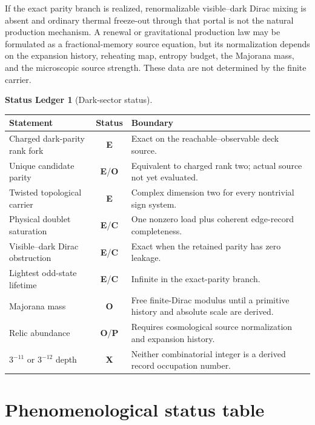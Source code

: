 \documentclass[11pt,oneside,openany]{book}
\numberwithin{equation}{chapter}
\theoremstyle{definition}
\newtheorem{ledger}[theorem]{Status Ledger}
\theoremstyle{remark}
\newcommand{\statusE}{\textcolor{ExactColor}{\textbf{E}}}
\newcommand{\statusC}{\textcolor{CondColor}{\textbf{C}}}
\newcommand{\statusP}{\textcolor{PostColor}{\textbf{P}}}
\newcommand{\statusO}{\textcolor{OpenColor}{\textbf{O}}}
\newcommand{\statusX}{\textcolor{SuperColor}{\textbf{X}}}
\begin{document}
If the exact parity branch is realized, renormalizable visible--dark Dirac
mixing is absent and ordinary thermal freeze-out through that portal is not
the natural production mechanism.  A renewal or gravitational production
law may be formulated as a fractional-memory source equation, but its
normalization depends on the expansion history, reheating map, entropy
budget, the Majorana mass, and the microscopic source strength.  These data
are not determined by the finite carrier.

\begin{ledger}[Dark-sector status]
\begin{center}
\begin{tabularx}{0.96\textwidth}{@{}p{}cX@{}}
\toprule
Statement & Status & Boundary\\
\midrule
Charged dark-parity rank fork & \statusE & Exact on the reachable--observable deck source.\\
Unique candidate parity & \statusE/\statusO & Equivalent to charged rank two; actual source not yet evaluated.\\
Twisted topological carrier & \statusE & Complex dimension two for every nontrivial sign system.\\
Physical doublet saturation & \statusE/\statusC & One nonzero load plus coherent edge-record completeness.\\
Visible--dark Dirac obstruction & \statusE/\statusC & Exact when the retained parity has zero leakage.\\
Lightest odd-state lifetime & \statusE/\statusC & Infinite in the exact-parity branch.\\
Majorana mass & \statusO & Free finite-Dirac modulus until a primitive history and absolute scale are derived.\\
Relic abundance & \statusO/\statusP & Requires cosmological source normalization and expansion history.\\
\(3^{-11}\) or \(3^{-12}\) depth & \statusX & Neither combinatorial integer is a derived record occupation number.\\
\bottomrule
\end{tabularx}
\end{center}
\end{ledger}
\chapter{Phenomenological status table}
\label{ch:phenom-ledger}
\end{document}
